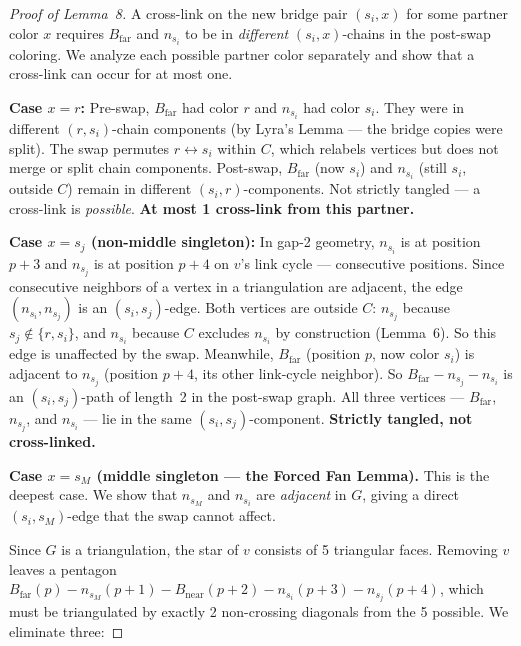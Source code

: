 \documentclass[11pt]{article}
\theoremstyle{remark}
\begin{document}
\begin{proof}[Proof of Lemma~8]
A cross-link on the new bridge pair $(s_i, x)$ for some partner color $x$ requires $B_{\mathrm{far}}$ and $n_{s_i}$ to be in \emph{different} $(s_i, x)$-chains in the post-swap coloring. We analyze each possible partner color separately and show that a cross-link can occur for at most one.

\medskip
\noindent\textbf{Case $x = r$:} Pre-swap, $B_{\mathrm{far}}$ had color $r$ and $n_{s_i}$ had color $s_i$. They were in different $(r, s_i)$-chain components (by Lyra's Lemma --- the bridge copies were split). The swap permutes $r \leftrightarrow s_i$ within $C$, which relabels vertices but does not merge or split chain components. Post-swap, $B_{\mathrm{far}}$ (now $s_i$) and $n_{s_i}$ (still $s_i$, outside $C$) remain in different $(s_i, r)$-components. Not strictly tangled --- a cross-link is \emph{possible}. \textbf{At most 1 cross-link from this partner.}

\medskip
\noindent\textbf{Case $x = s_j$ (non-middle singleton):} In gap-2 geometry, $n_{s_i}$ is at position $p+3$ and $n_{s_j}$ is at position $p+4$ on $v$'s link cycle --- consecutive positions. Since consecutive neighbors of a vertex in a triangulation are adjacent, the edge $(n_{s_i}, n_{s_j})$ is an $(s_i, s_j)$-edge. Both vertices are outside $C$: $n_{s_j}$ because $s_j \notin \{r, s_i\}$, and $n_{s_i}$ because $C$ excludes $n_{s_i}$ by construction (Lemma~6). So this edge is unaffected by the swap. Meanwhile, $B_{\mathrm{far}}$ (position $p$, now color $s_i$) is adjacent to $n_{s_j}$ (position $p+4$, its other link-cycle neighbor). So $B_{\mathrm{far}} - n_{s_j} - n_{s_i}$ is an $(s_i, s_j)$-path of length~2 in the post-swap graph. All three vertices --- $B_{\mathrm{far}}$, $n_{s_j}$, and $n_{s_i}$ --- lie in the same $(s_i, s_j)$-component. \textbf{Strictly tangled, not cross-linked.}

\medskip
\noindent\textbf{Case $x = s_M$ (middle singleton --- the Forced Fan Lemma).} This is the deepest case. We show that $n_{s_M}$ and $n_{s_i}$ are \emph{adjacent} in $G$, giving a direct $(s_i, s_M)$-edge that the swap cannot affect.

Since $G$ is a triangulation, the star of $v$ consists of 5 triangular faces. Removing $v$ leaves a pentagon $B_{\mathrm{far}}(p) - n_{s_M}(p{+}1) - B_{\mathrm{near}}(p{+}2) - n_{s_i}(p{+}3) - n_{s_j}(p{+}4)$, which must be triangulated by exactly 2 non-crossing diagonals from the 5 possible. We eliminate three:


\end{proof}
\end{document}
